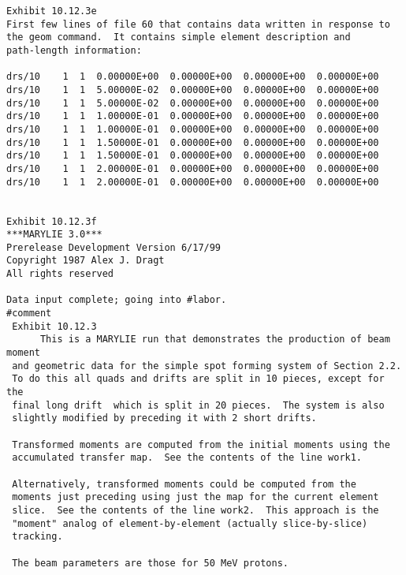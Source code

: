 \begin{footnotesize}
\begin{verbatim}
Exhibit 10.12.3e
First few lines of file 60 that contains data written in response to
the geom command.  It contains simple element description and
path-length information:

drs/10    1  1  0.00000E+00  0.00000E+00  0.00000E+00  0.00000E+00
drs/10    1  1  5.00000E-02  0.00000E+00  0.00000E+00  0.00000E+00
drs/10    1  1  5.00000E-02  0.00000E+00  0.00000E+00  0.00000E+00
drs/10    1  1  1.00000E-01  0.00000E+00  0.00000E+00  0.00000E+00
drs/10    1  1  1.00000E-01  0.00000E+00  0.00000E+00  0.00000E+00
drs/10    1  1  1.50000E-01  0.00000E+00  0.00000E+00  0.00000E+00
drs/10    1  1  1.50000E-01  0.00000E+00  0.00000E+00  0.00000E+00
drs/10    1  1  2.00000E-01  0.00000E+00  0.00000E+00  0.00000E+00
drs/10    1  1  2.00000E-01  0.00000E+00  0.00000E+00  0.00000E+00


Exhibit 10.12.3f
***MARYLIE 3.0***
Prerelease Development Version 6/17/99
Copyright 1987 Alex J. Dragt
All rights reserved

Data input complete; going into #labor.
#comment
 Exhibit 10.12.3
      This is a MARYLIE run that demonstrates the production of beam moment
 and geometric data for the simple spot forming system of Section 2.2.
 To do this all quads and drifts are split in 10 pieces, except for the
 final long drift  which is split in 20 pieces.  The system is also
 slightly modified by preceding it with 2 short drifts.

 Transformed moments are computed from the initial moments using the
 accumulated transfer map.  See the contents of the line work1.

 Alternatively, transformed moments could be computed from the
 moments just preceding using just the map for the current element
 slice.  See the contents of the line work2.  This approach is the
 "moment" analog of element-by-element (actually slice-by-slice)
 tracking.

 The beam parameters are those for 50 MeV protons.


\end{verbatim}
\end{footnotesize}

